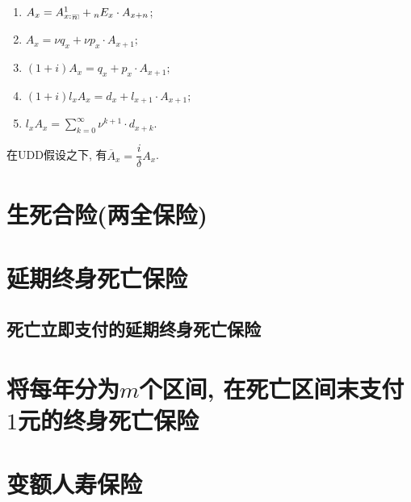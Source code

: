 \documentclass[lang=cn,10pt]{elegantbook}
\makeatletter
\DeclareRobustCommand{\annu}[1]{_{%
    \def\arraystretch{0}%
    \setlength\arraycolsep{1pt}%
    \setlength\arrayrulewidth{.2pt}%
    \begin{array}[b]{@{}c|}\hline
        \\[\arraycolsep]%
        \scriptstyle #1%
    \end{array}%
}}
\makeatother
\begin{document}
\begin{corollary}[精算现值的性质]
	\begin{enumerate}
		\item ${A}_x = {A}_{x:}^1{}_{\annu{n}} + {}_nE_{x}\cdot {A}_{x+n}$;
		\item ${A}_x = \nu q_x + \nu p_x\cdot {A}_{x+1};$
		\item $(1+i){A}_x = q_x + p_x\cdot {A}_{x+1};$
		\item $(1+i)l_x{A}_x = d_x + l_{x+1}\cdot {A}_{x+1};$
		\item $l_x{A}_x = \sum_{k=0}^{\infty }{\nu^{k+1}\cdot d_{x+k}}.$
	\end{enumerate}
\end{corollary}

\begin{proposition}
	在UDD假设之下, 有$\overline A_x=\dfrac{i}{\delta}A_x$.
  \end{proposition}

\section{生死合险(两全保险)}

\section{延期终身死亡保险}
\subsection{死亡立即支付的延期终身死亡保险}

















\section{将每年分为$m$个区间, 在死亡区间末支付$1$元的终身死亡保险}

\section{变额人寿保险}
\end{document}
